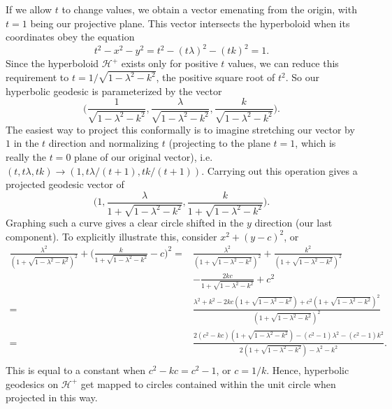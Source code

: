 \documentclass[../road-to-reality.tex]{subfiles}
\begin{document}
\begin{questions}
\begin{solution}
    If we allow $t$ to change values, we obtain a vector emenating from the origin, with $t=1$ being our projective plane. This vector intersects the hyperboloid when its coordinates obey the equation
    \[
      t^2 - x^2 - y^2 = t^2 - (t\lambda)^2 - (tk)^2 = 1.
    \]
    Since the hyperboloid $\mathcal{H}^+$ exists only for positive $t$ values, we can reduce this requirement to $t = 1/\sqrt{1-\lambda^2-k^2}$, the positive square root of $t^2$. So our hyperbolic geodesic is parameterized by the vector
    \[
      \Big(\frac{1}{\sqrt{1 - \lambda^2 - k^2}},\frac{\lambda}{\sqrt{1 - \lambda^2 - k^2}},\frac{k}{\sqrt{1 - \lambda^2 - k^2}}\Big).
    \]
    The easiest way to project this conformally is to imagine stretching our vector by $1$ in the $t$ direction and normalizing $t$ (projecting to the plane $t = 1$, which is really the $t=0$ plane of our original vector), i.e. $(t, t\lambda, tk) \to (1, t\lambda/(t+1), tk/(t+1))$. Carrying out this operation gives a projected geodesic vector of 
    \[
      \Big(1, \frac{\lambda}{1 + \sqrt{1 - \lambda^2 - k^2}}, \frac{k}{1 + \sqrt{1 - \lambda^2 - k^2}}).
    \]
    Graphing such a curve gives a clear circle shifted in the $y$ direction (our last component). To explicitly illustrate this, consider $x^2 + (y - c)^2$, or
    \begin{align*}
      \frac{\lambda^2}{(1+\sqrt{1-\lambda^2-k^2})^2} + \Big(\frac{k}{1+\sqrt{1-\lambda^2-k^2}}-c\Big)^2 = &\frac{\lambda^2}{(1+\sqrt{1-\lambda^2-k^2})^2} + \frac{k^2}{(1 + \sqrt{1 - \lambda^2 - k^2})^2} \\
                                                                                                            &- \frac{2kc}{1+\sqrt{1-\lambda^2-k^2}} + c^2 \\
                                                                                                        = &\frac{\lambda^2 + k^2 - 2kc(1 + \sqrt{1 - \lambda^2 - k^2}) + c^2(1 + \sqrt{1 - \lambda^2 - k^2})^2}{(1 + \sqrt{1 - \lambda^2 - k^2})^2} \\
                                                                                                        = &\frac{2(c^2-kc)(1 + \sqrt{1 - \lambda^2 - k^2}) - (c^2 - 1)\lambda^2 - (c^2 - 1)k^2}{2(1 + \sqrt{1 - \lambda^2 - k^2}) - \lambda^2 - k^2}. \\
    \end{align*}
    This is equal to a constant when $c^2 - kc = c^2 - 1$, or $c = 1/k$. Hence, hyperbolic geodesics on $\mathcal{H}^+$ get mapped to circles contained within the unit circle when projected in this way.


\end{solution}
\end{questions}
\end{document}
